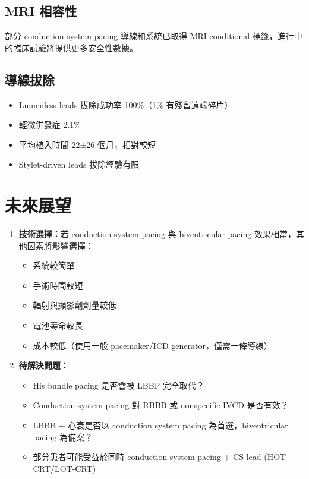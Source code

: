 \documentclass[12pt,a4paper]{article}
\begin{document}
\subsection{MRI 相容性}

部分 conduction system pacing 導線和系統已取得 MRI conditional 標籤，進行中的臨床試驗將提供更多安全性數據。

\subsection{導線拔除}

\begin{itemize}
    \item Lumenless leads 拔除成功率 100\%（1\% 有殘留遠端碎片）
    \item 輕微併發症 2.1\%
    \item 平均植入時間 22±26 個月，相對較短
    \item Stylet-driven leads 拔除經驗有限
\end{itemize}

\section{未來展望}

\begin{enumerate}
    \item \textbf{技術選擇：}若 conduction system pacing 與 biventricular pacing 效果相當，其他因素將影響選擇：
    \begin{itemize}
        \item 系統較簡單
        \item 手術時間較短
        \item 輻射與顯影劑劑量較低
        \item 電池壽命較長
        \item 成本較低（使用一般 pacemaker/ICD generator，僅需一條導線）
    \end{itemize}

    \item \textbf{待解決問題：}
    \begin{itemize}
        \item His bundle pacing 是否會被 LBBP 完全取代？
        \item Conduction system pacing 對 RBBB 或 nonspecific IVCD 是否有效？
        \item LBBB + 心衰是否以 conduction system pacing 為首選，biventricular pacing 為備案？
        \item 部分患者可能受益於同時 conduction system pacing + CS lead (HOT-CRT/LOT-CRT)
    \end{itemize}
\end{enumerate}
\end{document}
